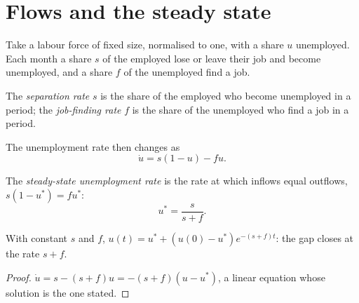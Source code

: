 \section{Flows and the steady state}\label{sec:b1:unemployment-flows:flows}

Take a labour force of fixed size, normalised to one, with a share $u$
unemployed. Each month a share $s$ of the employed lose or leave their job
and become unemployed, and a share $f$ of the unemployed find a job.

\begin{definition}\label{def:b1:unemployment-flows:rates}
The \emph{separation rate} $s$ is the share of the employed who become
unemployed in a period; the \emph{job-finding rate} $f$ is the share of the
unemployed who find a job in a period.
\end{definition}

The unemployment rate then changes as
\[
\dot u = s(1 - u) - fu .
\]

\begin{definition}\label{def:b1:unemployment-flows:steady-state-rate}
The \emph{steady-state unemployment rate} is the rate at which inflows equal
outflows, $s(1 - u^*) = fu^*$:
\[
u^* = \frac{s}{s + f}.
\]
\end{definition}

\begin{proposition}[Convergence]\label{prop:b1:unemployment-flows:convergence}
With constant $s$ and $f$, $u(t) = u^* + (u(0) - u^*)e^{-(s + f)t}$: the gap closes at the rate $s + f$.
\end{proposition}

\begin{proof}
$\dot u = s - (s + f)u = -(s + f)(u - u^*)$, a linear equation whose solution is the one stated.
\end{proof}

